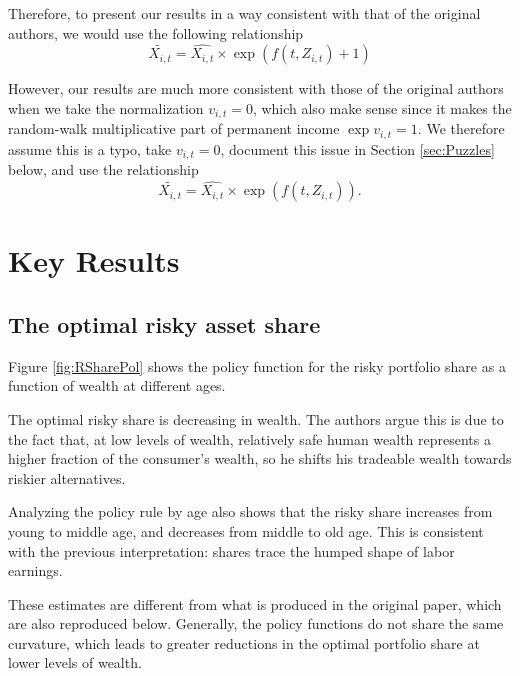 \documentclass[./CGMPortfolio.tex]{subfiles}
\begin{document}
Therefore, to present our results in a way consistent with that of the original authors, we would use the following relationship
\begin{equation}
\tilde{X_{i,t}} = \hat{X_{i,t}} \times \exp (f(t,Z_{i,t})+1)
\end{equation}

However, our results are much more consistent with those of the original authors when we take the normalization $v_{i,t} = 0$, which also make sense since it makes the random-walk multiplicative part of permanent income $\exp{v_{i,t}}=1$. We therefore assume this is a typo, take $v_{i,t} = 0$, document this issue in Section \ref{sec:Puzzles} below, and use the relationship
\begin{equation}
\tilde{X_{i,t}} = \hat{X_{i,t}} \times \exp (f(t,Z_{i,t})).
\end{equation}

\hypertarget{Key-Results}{}
\section{Key Results}

\subsection{The optimal risky asset share}

Figure \ref{fig:RSharePol} shows the policy function for the risky portfolio share as a function of wealth at different ages.

The optimal risky share is decreasing in wealth. The authors argue this is due to the fact that, at low levels of wealth, relatively safe human wealth represents a higher fraction of the consumer's wealth, so he shifts his tradeable wealth towards riskier alternatives.

Analyzing the policy rule by age also shows that the risky share increases from young to middle age, and decreases from middle to old age. This is consistent with the previous interpretation: shares trace the humped shape of labor earnings.

These estimates are different from what is produced in the original paper, which are also reproduced below. Generally, the policy functions do not share the same curvature, which leads to greater reductions in the optimal portfolio share at lower levels of wealth.

\providecommand{\figName}{Risky-Share-Policy-Function} %
\providecommand{\figFile}{RShare_Pol} %
\hypertarget{\figFile}{}
\hypertarget{\figName}{}
\end{document}
